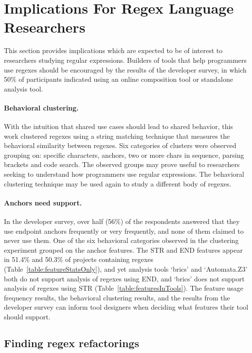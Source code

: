 \section{Implications For Regex Language Researchers}
This section provides implications which are expected to be of interest to researchers studying regular expressions.  Builders of tools that help programmers use regexes should be encouraged by the results of the developer survey, in which 50\% of participants indicated using an online composition tool or standalone analysis tool.

\paragraph{Behavioral clustering.}  With the intuition that shared use cases should lead to shared behavior, this work clustered regexes using a string matching technique that measures the behavioral similarity between regexes.  Six categories of clusters were observed grouping on: specific characters, anchors, two or more chars in sequence, parsing brackets and code search.  The observed groups may prove useful to researchers seeking to understand how programmers use regular expressions.  The behavioral clustering technique may be used again to study a different body of regexes.

\paragraph{Anchors need support.}  In the developer survey, over half (56\%) of the respondents answered that they use endpoint anchors frequently or very frequently, and none of them claimed to never use them.  One of the six behavioral categories observed in the clustering experiment grouped on the anchor features.  The STR and END features appear in 51.4\% and 50.3\% of projects containing regexes (Table~\ref{table:featureStatsOnly}), and yet analysis tools `brics' and `Automata.Z3' both do not support analysis of regexes using END, and `brics' does not support analysis of regexes using STR (Table~\ref{table:featuresInTools}).  The feature usage frequency results, the behavioral clustering results, and the results from the developer survey can inform tool designers when deciding what features their tool should support.

\subsection{Finding regex refactorings}

